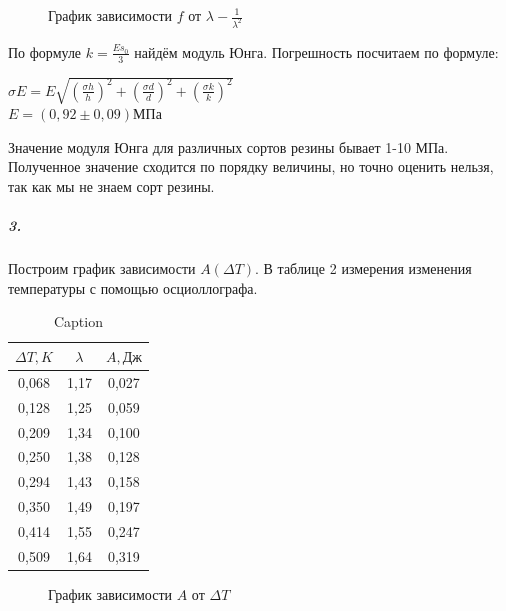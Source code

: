 \documentclass[a4paper,12pt]{article}
\begin{document}
\begin{figure}[h]
	\caption{График зависимости $f$ от $\lambda - \frac{1}{\lambda^2}$}
	\label{ris:ustanovka}
\end{figure}
По формуле $k = \frac{Es_0}{3}$ найдём модуль Юнга. Погрешность посчитаем по формуле:
\begin{center}
    $\sigma E = E\sqrt{(\frac{\sigma h}{h})^2 + (\frac{\sigma d}{d})^2 + (\frac{\sigma k}{k})^2}$ \\
    $E = (0,92 \pm 0,09)МПа$
\end{center}
Значение модуля Юнга для различных сортов резины бывает 1-10 МПа. Полученное значение сходится по порядку величины, но точно оценить нельзя, так как мы не знаем сорт резины.
\subparagraph{3.}Построим график зависимости $A(\Delta T)$. В таблице 2 измерения изменения температуры с помощью осциоллографа.
\begin{table}[h]
    \centering
    \begin{tabular}{|c|c|c|}
    \hline
        $\Delta T, K$ & $\lambda$ & $A, Дж$ \\ \hline
        0,068 & 1,17 & 0,027\\ \hline
        0,128 & 1,25 & 0,059\\ \hline
        0,209 & 1,34 & 0,100\\ \hline
        0,250 & 1,38 & 0,128\\ \hline
        0,294 & 1,43 & 0,158\\ \hline
        0,350 & 1,49 & 0,197\\ \hline
        0,414 & 1,55 & 0,247\\ \hline
        0,509 & 1,64 & 0,319\\ \hline
    \end{tabular}
    \caption{Caption}
    \label{tab:my_label}
\end{table}
\begin{figure}[h]
	\caption{График зависимости $A$ от $\Delta T$}
	\label{ris:ustanovka}
\end{figure}\\
\end{document}

